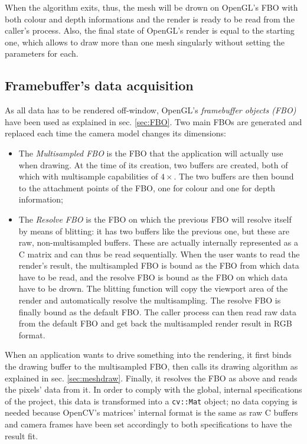 When the algorithm exits, thus, the mesh will be drown on OpenGL's FBO %
with both colour and depth informations and the render is ready to be read from the
caller's process. Also, the final state of OpenGL's render is equal to the
starting one, which allows to draw more than one mesh singularly without
setting the parameters for each.

\subsection{Framebuffer's data acquisition}
As all data has to be rendered off-window, OpenGL's \emph{framebuffer objects
(\emph{FBO})} have been used as explained in sec. \ref{sec:FBO}. Two main FBOs
are generated and replaced each time the camera model changes its dimensions:

\begin{itemize}
  \item{The \emph{Multisampled FBO} is the FBO that the application will
      actually use when drawing. At the time of its creation, two buffers are
      created, both of which with multisample capabilities of $4\times$. The two
      buffers are then bound to the attachment points of the FBO, one for colour
    and one for depth information;}
  \item{The \emph{Resolve FBO} is the FBO on which the previous FBO will resolve
      itself by means of blitting: it has two buffers like the previous one, but
      these are raw, non-multisampled buffers. These are actually internally
      represented as a C matrix and can thus be read sequentially.
      When the user wants to read the render's result, the multisampled FBO is bound
      as the FBO from which data have to be read, and the resolve FBO is bound
      as the FBO on which data have to be drown. The blitting function will copy
      the viewport area of the render and automatically resolve the
      multisampling. The resolve FBO is finally bound as the default FBO. The
      caller process can then read raw data from the default FBO and get
    back the multisampled render result in RGB format.}
\end{itemize}

When an application wants to drive something into the rendering, it first binds
the drawing buffer to the multisampled FBO, then calls its drawing algorithm as
explained in sec. \ref{sec:meshdraw}. Finally, it resolves the FBO as above and
reads the pixels' data from it. In order to comply with the global, internal
specifications of the project, this data is transformed into a \texttt{cv::Mat}
object; no data copying is needed because OpenCV's matrices' internal format is
the same as raw C buffers and camera frames have been set accordingly to both
specifications to have the result fit.

